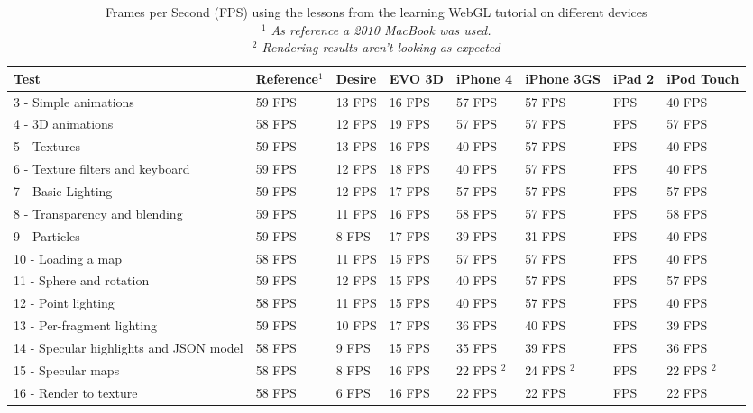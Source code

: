 \documentclass[12pt,journal,compsoc]{IEEEtran}
\begin{document}
\begin{table*}[tb]
	\begin{centering}
	\begin{tabular}{l|l|l|l|l|l|l|l}
		Test										& Reference$^{1}$& Desire		& EVO 3D		& iPhone 4		& iPhone 3GS	& iPad 2	& iPod Touch\\
		\hline
		3 - Simple animations						& 59 FPS		& 13 FPS		& 16 FPS		& 57 FPS		& 57 FPS		&    FPS	& 40 FPS				\\
		4 - 3D animations							& 58 FPS		& 12 FPS		& 19 FPS		& 57 FPS		& 57 FPS		&    FPS	& 57 FPS				\\
		5 - Textures								& 59 FPS		& 13 FPS		& 16 FPS		& 40 FPS		& 57 FPS		&    FPS	& 40 FPS				\\
		6 - Texture filters and keyboard			& 59 FPS		& 12 FPS		& 18 FPS		& 40 FPS		& 57 FPS		&    FPS	& 40 FPS				\\
		7 - Basic Lighting							& 59 FPS		& 12 FPS		& 17 FPS		& 57 FPS		& 57 FPS		&    FPS	& 57 FPS				\\
		8 - Transparency and blending				& 59 FPS		& 11 FPS		& 16 FPS		& 58 FPS		& 57 FPS		&    FPS	& 58 FPS				\\
		9 - Particles								& 59 FPS		&  8 FPS		& 17 FPS		& 39 FPS		& 31 FPS		&    FPS	& 40 FPS				\\
		10 - Loading a map							& 58 FPS		& 11 FPS		& 15 FPS		& 57 FPS		& 57 FPS		&    FPS	& 40 FPS				\\
		11 - Sphere and rotation					& 59 FPS		& 12 FPS		& 15 FPS		& 40 FPS		& 57 FPS		&    FPS	& 57 FPS				\\
		12 - Point lighting							& 58 FPS		& 11 FPS		& 15 FPS		& 40 FPS		& 57 FPS		&    FPS	& 40 FPS				\\
		13 - Per-fragment lighting					& 59 FPS		& 10 FPS		& 17 FPS		& 36 FPS		& 40 FPS		&    FPS	& 39 FPS				\\
		14 - Specular highlights and JSON model		& 58 FPS		&  9 FPS		& 15 FPS		& 35 FPS		& 39 FPS		&    FPS	& 36 FPS				\\
		15 - Specular maps							& 58 FPS		&  8 FPS		& 16 FPS		& 22 FPS $^{2}$	& 24 FPS $^{2}$	&    FPS	& 22 FPS $^{2}$ 		\\
		16 - Render to texture						& 58 FPS		&  6 FPS		& 16 FPS		& 22 FPS		& 22 FPS		&    FPS	& 22 FPS				\\
	\end{tabular}
	\caption{Frames per Second (FPS) using the lessons from the learning WebGL tutorial on different devices\label{lessonsTable}
	\\\textit{$^{1}$ As reference a 2010 MacBook was used.}
	\\\textit{$^{2}$ Rendering results aren't looking as expected}
	}
	\end{centering}
\end{table*}
\end{document}
